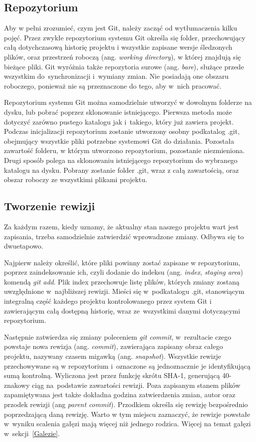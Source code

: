 \documentclass[12pt,a4paper,polish,thesis]{dcsbook}
\begin{document}
	\subsection{Repozytorium}

	Aby w pełni zrozumieć, czym jest Git, należy zacząć od wytłumaczenia kilku pojęć. Przez zwykłe repozytorium systemu Git określa się folder, przechowujący całą dotychczasową historię projektu i wszystkie zapisane wersje śledzonych plików, oraz przestrzeń roboczą (ang. \textit{working directory}), w której znajdują się bieżące pliki. Git wyróżnia także repozytoria surowe (ang. \textit{bare}), służące przede wszystkim do~synchronizacji i~wymiany zmian. Nie posiadają one obszaru roboczego, ponieważ nie są przeznaczone do tego, aby w~nich pracować.

	Repozytorium systemu Git można samodzielnie utworzyć w dowolnym folderze na dysku, lub pobrać poprzez sklonowanie istniejącego. Pierwsza metoda może dotyczyć zarówno pustego katalogu jak i~takiego, który już zawiera projekt. Podczas inicjalizacji repozytorium zostanie utworzony osobny podkatalog .git, obejmujący wszystkie pliki potrzebne systemowi Git do działania. Pozostała zawartość folderu, w którym utworzono repozytorium, pozostanie niezmieniona. Drugi sposób polega na sklonowaniu istniejącego repozytorium do wybranego katalogu na dysku. Pobrany zostanie folder .git, wraz z całą zawartością, oraz obszar roboczy ze wszystkimi plikami projektu.

	\subsection{Tworzenie rewizji}
	Za każdym razem, kiedy uznamy, że aktualny stan naszego projektu wart jest zapisania, trzeba samodzielnie zatwierdzić wprowadzone zmiany. Odbywa się to dwuetapowo.

	Najpierw należy określić, które pliki powinny zostać zapisane w repozytorium, poprzez zaindeksowanie ich, czyli dodanie do indeksu (ang. \textit{index}, \textit{staging area}) komendą \textit{git add}. Plik index przechowuje listę plików, których zmiany zostaną uwzględnione w~najbliższej rewizji. Mieści się w~podkatalogu .git, stanowiącym integralną część każdego projektu kontrolowanego przez system Git i zawierającym całą dostępną historię, wraz ze~wszystkimi danymi dotyczącymi repozytorium.

	Następnie zatwierdza się zmiany poleceniem \textit{git commit}, w~rezultacie czego powstaje nowa rewizja (ang. \textit{commit}), zawierająca zapisany obraz całego projektu, nazywany czasem migawką (ang. \textit{snapshot}). Wszystkie rewizje przechowywane są w repozytorium i~oznaczone są jednoznacznie je identyfikującą sumą kontrolną. Wyliczona jest przez funkcję skrótu \mbox{SHA-1}, generującą 40-znakowy ciąg na~podstawie zawartości rewizji. Poza zapisanym stanem plików zapamiętywana jest także dokładna godzina zatwierdzenia zmian, autor oraz przodek rewizji (ang \textit{parent commit}). Przodkiem określa się rewizję bezpośrednio poprzedzającą daną rewizję. Warto w tym miejscu zaznaczyć, że rewizje powstałe w~wyniku scalenia gałęzi mają więcej niż jednego rodzica. Więcej na temat gałęzi w~sekcji~\ref{Galezie}.
\end{document}
